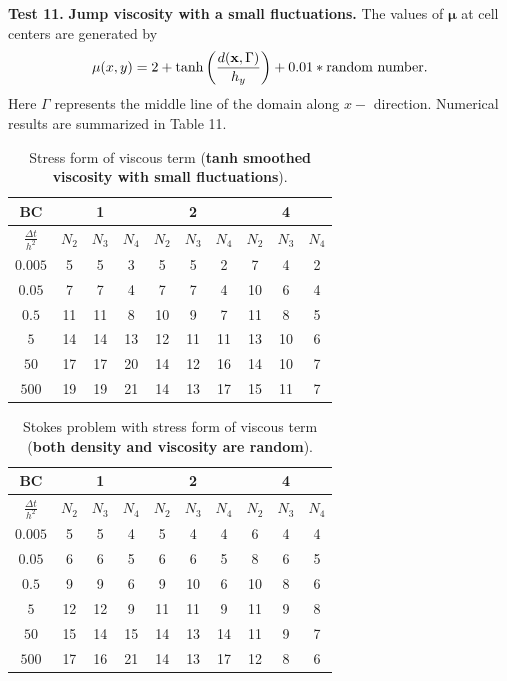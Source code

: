\documentclass[9pt]{article}
\newcommand{\V}[1]{\boldsymbol{#1}}
\begin{document}
{\bf Test 11.} {\bf Jump viscosity with a small fluctuations.} The values of ${\V{\mu}}$ at cell centers are generated by
$$
\mu (x, y) = 2+\mbox{tanh}\left(\frac{d({\bf x}, \Gamma)}{h_y} \right)+  0.01 * \mbox{random number}.
$$
Here $\Gamma$ represents the middle line of the domain along $x-$ direction. Numerical results are summarized in Table 11.
\begin{table}[h]
\begin{center}
\begin{tabular}{|c||ccc|ccc|ccc|}
\hline
BC     &     &1     &      &     &2    &     &    &4     & \\
\hline
$\frac{\Delta t}{h^2}$  &$N_2$ &$N_3$ &$N_4$   &$N_2$ &$N_3$ &$N_4$  &$N_2$ & $N_3$ &$N_4$  \\
\hline
\hline
$0.005$    &5  &5  &3     &5  &5  &2     &7   &4   &2 \\
\hline
$0.05$     &7  &7  &4     &7  &7  &4     &10  &6   &4\\
\hline
$0.5$     &11 &11  &8     &10 &9  &7     &11  &8   &5\\
\hline
$5$       &14 &14 &13    &12 &11  &11    &13  &10  &6\\
\hline
$50$      &17 &17 &20    &14 &12  &16    &14  &10  &7\\
\hline
$500$     &19 &19 &21    &14 &13  &17    &15  &11  &7\\
\hline
\end{tabular}
\vspace{2mm} \caption{Stress form of viscous term ({\bf tanh smoothed viscosity with small fluctuations}). }
\end{center}
\end{table}


\begin{table}[h]
\begin{center}
\begin{tabular}{|c||ccc|ccc|ccc|}
\hline
BC     &     &1   &  &   &2   &    &   &4     & \\
\hline
$\frac{\Delta t}{h^2}$  &$N_2$ &$N_3$ &$N_4$   &$N_2$ &$N_3$ &$N_4$   &$N_2$ & $N_3$ &$N_4$  \\
\hline
\hline
$0.005$   &5   &5   &4      &5  &4  &4      &6   &4  &4 \\
\hline
$0.05$    &6   &6   &5      &6  &6  &5      &8   &6  &5\\
\hline
$0.5$     &9   &9   &6      &9 &10  &6      &10  &8  &6\\
\hline
$5$       &12  &12  &9     &11 &11  &9      &11  &9  &8\\
\hline
$50$      &15  &14 &15     &14 &13 &14      &11  &9  &7\\
\hline
$500$     &17  &16 &21     &14 &13 &17      &12  &8   &6\\
\hline
\end{tabular}
\vspace{2mm} \caption{Stokes problem with stress form of viscous term ({\bf both density and viscosity are random}).}
\end{center}
\end{table}
\end{document}
